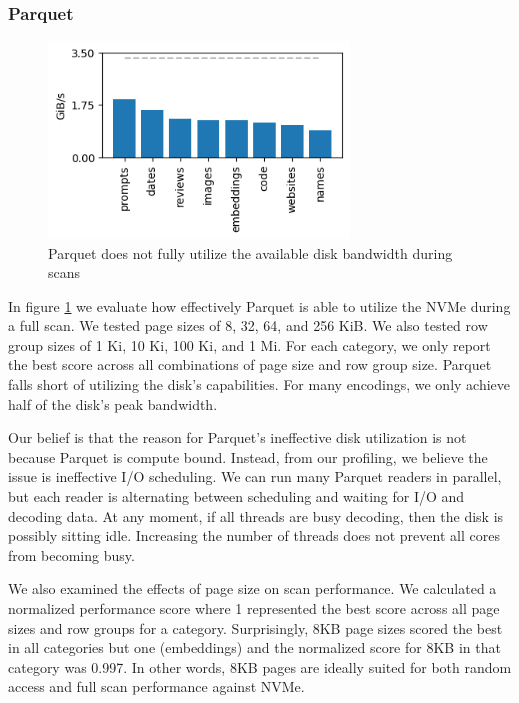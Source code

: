\documentclass[sigconf, nonacm]{acmart}
\begin{document}
\subsubsection{Parquet}

\begin{figure}[h]
    \centering
    \includegraphics[width=8cm]{figures/parquet_scan_disk.png}
    \caption{Parquet does not fully utilize the available disk bandwidth during scans}
    \label{fig:parquet-scan-disk}
\end{figure}

In figure \ref{fig:parquet-scan-disk} we evaluate how effectively Parquet is able to utilize the NVMe during a full scan.  We tested page sizes of 8, 32, 64, and 256 KiB.  We also tested row group sizes of 1 Ki, 10 Ki, 100 Ki, and 1 Mi.  For each category, we only report the best score across all combinations of page size and row group size.  Parquet falls short of utilizing the disk's capabilities.  For many encodings, we only achieve half of the disk's peak bandwidth.

Our belief is that the reason for Parquet's ineffective disk utilization is not because Parquet is compute bound.  Instead, from our profiling, we believe the issue is ineffective I/O scheduling.  We can run many Parquet readers in parallel, but each reader is alternating between scheduling and waiting for I/O and decoding data.  At any moment, if all threads are busy decoding, then the disk is possibly sitting idle.  Increasing the number of threads does not prevent all cores from becoming busy.  

We also examined the effects of page size on scan performance.  We calculated a normalized performance score where 1 represented the best score across all page sizes and row groups for a category.  Surprisingly, 8KB page sizes scored the best in all categories but one (embeddings) and the normalized score for 8KB in that category was 0.997.  In other words, 8KB pages are ideally suited for both random access and full scan performance against NVMe.
\end{document}
